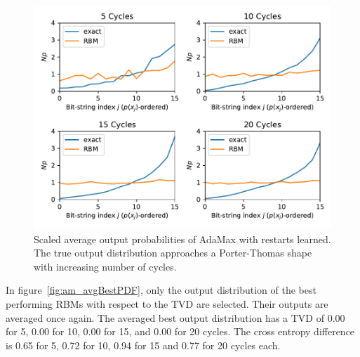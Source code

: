 \begin{figure}[H]
  \centering
  \includegraphics[width=\textwidth]{figures/results/AM-restarts-learned/avgPDF.pdf}
  \caption[Scaled average output probabilities of AdaMax with restarts learned]{
    Scaled average output probabilities of AdaMax with restarts learned. The true 
    output distribution approaches a Porter-Thomas shape with increasing number of cycles.}
  \label{fig:am_avgPDF}
\end{figure}

In figure~\ref{fig:am_avgBestPDF}, only the output distribution of the best performing RBMs with respect to the 
TVD are selected. Their outputs are averaged once again. The averaged best output distribution 
has a TVD of 0.00 for 5, 0.00 for 10, 0.00 for 15, and 0.00 for 20 
cycles. The cross entropy difference is 0.65 for 5, 0.72 for 10, 0.94 for 15 and 0.77 for 20 cycles each. 

